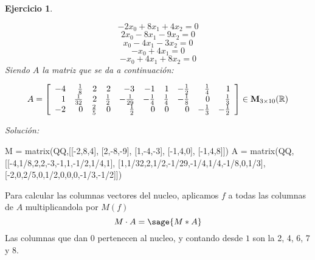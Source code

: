 \documentclass[12pt]{amsart}
\newtheorem{ejer}{Ejercicio}
\begin{document}
\begin{ejer}
\begin{minipage}{\textwidth}
\begin{tcolorbox}[colback = red!20!white,title=Versión Ecuaciones Implícitas]
\[ -2 x_{0} + 8 x_{1} + 4 x_{2} = 0 \]
\[ 2 x_{0} - 8 x_{1} - 9 x_{2} = 0 \]
\[ x_{0} - 4 x_{1} - 3 x_{2} = 0 \]
\[ -x_{0} + 4 x_{1} = 0 \]
\[ -x_{0} + 4 x_{1} + 8 x_{2} = 0 \]
Siendo $A$ la matriz que se da a continuación:
\end{tcolorbox}
\end{minipage}
\[ A = \left[\begin{array}{rrrrrrrrrr}
-4 & \frac{1}{8} & 2 & 2 & -3 & -1 & 1 & -\frac{1}{2} & \frac{1}{4} & 1 \\
1 & \frac{1}{32} & 2 & \frac{1}{2} & -\frac{1}{29} & -\frac{1}{4} & \frac{1}{4} & -\frac{1}{8} & 0 & \frac{1}{3} \\
-2 & 0 & \frac{2}{5} & 0 & \frac{1}{2} & 0 & 0 & 0 & -\frac{1}{3} & -\frac{1}{2}
\end{array}\right] \in {\bf M}_{3\times 10}({\mathbb R})\]
\end{ejer}

{\it Soluci\'on:}

\begin{sageblock}
M = matrix(QQ,[[-2,8,4],
[2,-8,-9],
[1,-4,-3],
[-1,4,0],
[-1,4,8]])
A = matrix(QQ,[[-4,1/8,2,2,-3,-1,1,-1/2,1/4,1],
[1,1/32,2,1/2,-1/29,-1/4,1/4,-1/8,0,1/3],
[-2,0,2/5,0,1/2,0,0,0,-1/3,-1/2]])
\end{sageblock}

Para calcular las columnas vectores del nucleo, aplicamos $f$ a todas las columnas de $A$ multiplicandola por $M(f)$
$$
	M\cdot A = \sage{M*A}
$$
Las columnas que dan $0$ pertenecen al nucleo, y contando desde $1$ son la 2, 4, 6, 7 y 8.

\end{document}
